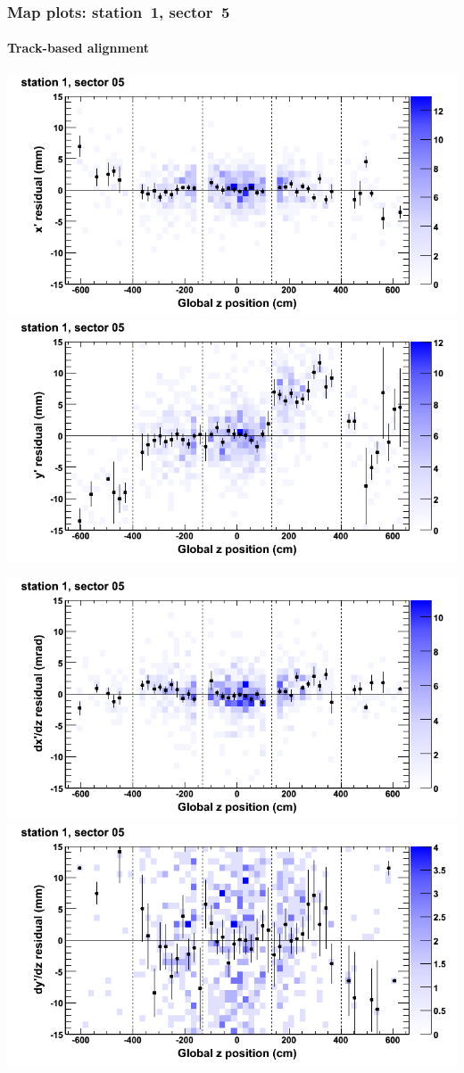 \documentclass[compress]{beamer}
\begin{document}
\begin{frame}
\frametitle{Map plots: station~1, sector~5}
\framesubtitle{Track-based alignment}
\includegraphics[width=0.5\linewidth]{mapplots_re05/DTvsz_st1sec05_x.png}
\includegraphics[width=0.5\linewidth]{mapplots_re05/DTvsz_st1sec05_y.png}

\includegraphics[width=0.5\linewidth]{mapplots_re05/DTvsz_st1sec05_dxdz.png}
\includegraphics[width=0.5\linewidth]{mapplots_re05/DTvsz_st1sec05_dydz.png}
\end{frame}
\end{document}
